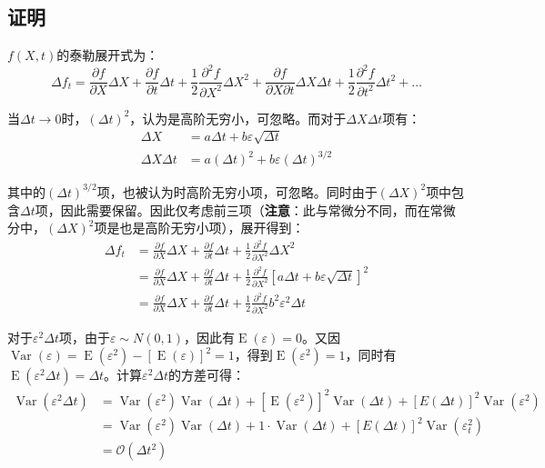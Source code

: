 \documentclass[11pt]{article}
\newcommand{\E}{\operatorname{E}}
\newcommand{\Var}{\operatorname{Var}}
\begin{document}
\subsection{证明}

$f(X,t)$的泰勒展开式为：
\begin{equation*}
    \Delta f_t = \frac{\partial f}{\partial X} \Delta X + \frac{\partial f}{\partial t} \Delta t + \frac{1}{2} \frac{\partial^2 f}{\partial X^2}\Delta X^2  + \frac{\partial f}{\partial X \partial t}\Delta X \Delta t + \frac{1}{2} \frac{\partial^2 f}{\partial t^2} \Delta t^2 + \dots
\end{equation*}

当$\Delta t \rightarrow 0$时，$(\Delta t)^2$，认为是高阶无穷小，可忽略。而对于$\Delta X \Delta t$项有：
\begin{align*}
    \Delta X &= a\Delta t + b \varepsilon\sqrt{\Delta t} \\
    \Delta X \Delta t &= a(\Delta t)^2 + b \varepsilon(\Delta t)^{3/2}
\end{align*}

其中的$(\Delta t)^{3/2}$项，也被认为时高阶无穷小项，可忽略。同时由于$(\Delta X)^2$项中包含$\Delta t$项，因此需要保留。因此仅考虑前三项（\textbf{注意}：此与常微分不同，而在常微分中，$(\Delta X)^2$项是也是高阶无穷小项），展开得到：
\begin{align*}
    \Delta f_t & = \frac{\partial f}{\partial X} \Delta X + \frac{\partial f}{\partial t} \Delta t + \frac{1}{2} \frac{\partial^2 f}{\partial X^2}\Delta X^2 \\
    & = \frac{\partial f}{\partial X} \Delta X + \frac{\partial f}{\partial t} \Delta t + \frac{1}{2} \frac{\partial^2 f}{\partial X^2} [a\Delta t + b\varepsilon\sqrt{\Delta t}]^2 \\
    & = \frac{\partial f}{\partial X} \Delta X + \frac{\partial f}{\partial t} \Delta t + \frac{1}{2} \frac{\partial^2 f}{\partial X^2} b^2 \varepsilon^2 \Delta t
\end{align*}

对于$\varepsilon^2 \Delta t$项，由于$\varepsilon \sim N(0,1)$，因此有$\E(\varepsilon)=0$。又因$\Var(\varepsilon)=\E(\varepsilon^2)-[\E(\varepsilon)]^2=1$，得到$\E(\varepsilon^2)=1$，同时有$\E(\varepsilon^2 \Delta t) = \Delta t$。计算$\varepsilon^2 \Delta t$的方差可得：
\begin{align*}
    \Var(\varepsilon^2 \Delta t) & = \Var(\varepsilon^2) \Var(\Delta t) + [\E(\varepsilon^2)]^2 \Var(\Delta t) + [E(\Delta t)]^2 \Var(\varepsilon^2) \\
    & = \Var(\varepsilon^2) \Var(\Delta t) + 1 \cdot \Var(\Delta t) + [E(\Delta t)]^2 \Var(\varepsilon_t^2) \\
    & = \mathcal{O}(\Delta t^2)
\end{align*}
\end{document}
